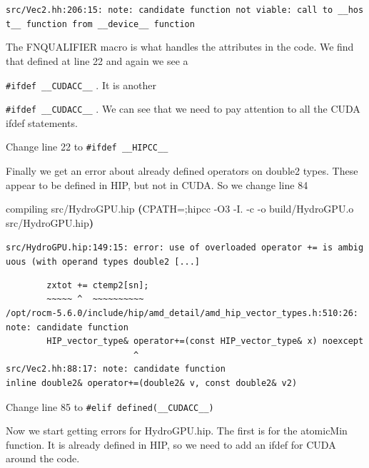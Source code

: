 \documentclass[
]{article}
\let\oldtexttt\texttt
\renewcommand{\texttt}[1]{
  \colorbox{Light}{\oldtexttt{#1}}
}
\newenvironment{Shaded}{}{}
\newcommand{\ExtensionTok}[1]{#1}
\newcommand{\KeywordTok}[1]{\textcolor[rgb]{0.00,0.44,0.13}{\textbf{#1}}}
\newcommand{\NormalTok}[1]{#1}
\newcommand{\VariableTok}[1]{\textcolor[rgb]{0.10,0.09,0.49}{#1}}
\begin{document}
{\small
\texttt{src/Vec2.hh:206:15:\ note:\ candidate\ function\ not\ viable:\ call\ to\ \_\_host\_\_\ function\ from\ \_\_device\_\_\ function}
}

The FNQUALIFIER macro is what handles the attributes in the code. We
find that defined at line 22 and again we see a
\texttt{\#ifdef\ \_\_CUDACC\_\_}. It is another
\texttt{\#ifdef\ \_\_CUDACC\_\_}. We can see that we need to pay
attention to all the CUDA ifdef statements.

Change line 22 to \texttt{\#ifdef\ \_\_HIPCC\_\_}

Finally we get an error about already defined operators on double2
types. These appear to be defined in HIP, but not in CUDA. So we change
line 84

\begin{Shaded}
\begin{Highlighting}[]
\ExtensionTok{compiling}\NormalTok{ src/HydroGPU.hip}
\KeywordTok{(}\VariableTok{CPATH=}\NormalTok{;}\ExtensionTok{hipcc}\NormalTok{ {-}O3 {-}I.  {-}c {-}o build/HydroGPU.o src/HydroGPU.hip}\KeywordTok{)}
\end{Highlighting}
\end{Shaded}

{\scriptsize
\texttt{src/HydroGPU.hip:149:15:\ error:\ use\ of\ overloaded\ operator\ \textquotesingle{}+=\textquotesingle{}\ is\ ambiguous\ (with\ operand\ types\ \textquotesingle{}double2  [...]}
}

\begin{verbatim}
        zxtot += ctemp2[sn];
        ~~~~~ ^  ~~~~~~~~~~
/opt/rocm-5.6.0/include/hip/amd_detail/amd_hip_vector_types.h:510:26: 
note: candidate function
        HIP_vector_type& operator+=(const HIP_vector_type& x) noexcept
                         ^
src/Vec2.hh:88:17: note: candidate function
inline double2& operator+=(double2& v, const double2& v2)
\end{verbatim}

Change line 85 to \texttt{\#elif\ defined(\_\_CUDACC\_\_)}

Now we start getting errors for HydroGPU.hip. The first is for the
atomicMin function. It is already defined in HIP, so we need to add an
ifdef for CUDA around the code.
\end{document}

